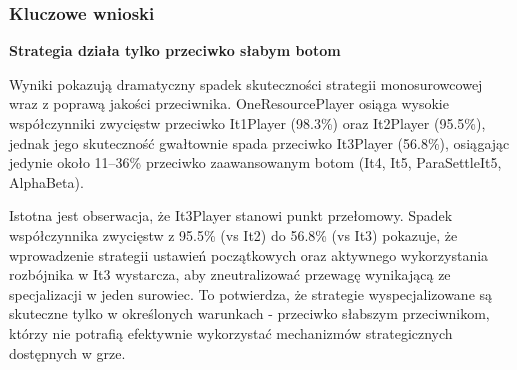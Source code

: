 \documentclass[polish,inz,longabstract]{iithesis}
\begin{document}
\begin{table}[h]
\centering
\caption{Podsumowanie wyników OneResourcePlayer – premie}
\medskip
\label{tab:oneresource-bonuses}
\end{table}

\subsubsection{Kluczowe wnioski}

\textbf{Strategia działa tylko przeciwko słabym botom}

Wyniki pokazują dramatyczny spadek skuteczności strategii monosurowcowej wraz z poprawą jakości przeciwnika. OneResourcePlayer osiąga wysokie współczynniki zwycięstw przeciwko It1Player (98.3\%) oraz It2Player (95.5\%), jednak jego skuteczność gwałtownie spada przeciwko It3Player (56.8\%), osiągając jedynie około 11--36\% przeciwko zaawansowanym botom (It4, It5, ParaSettleIt5, AlphaBeta).

Istotna jest obserwacja, że It3Player stanowi punkt przełomowy. Spadek współczynnika zwycięstw z 95.5\% (vs It2) do 56.8\% (vs It3) pokazuje, że wprowadzenie strategii ustawień początkowych oraz aktywnego wykorzystania rozbójnika w It3 wystarcza, aby zneutralizować przewagę wynikającą ze specjalizacji w jeden surowiec. To potwierdza, że strategie wyspecjalizowane są skuteczne tylko w określonych warunkach - przeciwko słabszym przeciwnikom, którzy nie potrafią efektywnie wykorzystać mechanizmów strategicznych dostępnych w grze.
\end{document}
